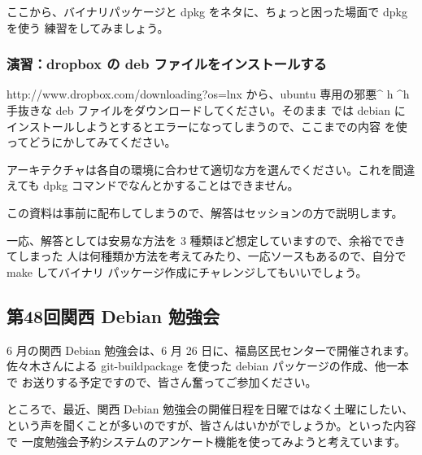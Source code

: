 \documentclass[mingoth,a4paper]{jsarticle}
\begin{document}
ここから、バイナリパッケージと dpkg をネタに、ちょっと困った場面で dpkg を使う
練習をしてみましょう。

\subsubsection{演習：dropbox の deb ファイルをインストールする}

http://www.dropbox.com/downloading?os=lnx から、ubuntu 専用の邪悪\textasciicircum
h \textasciicircum h 手抜きな deb ファイルをダウンロードしてください。そのまま
では debian にインストールしようとするとエラーになってしまうので、ここまでの内容
を使ってどうにかしてみてください。

アーキテクチャは各自の環境に合わせて適切な方を選んでください。これを間違えても
dpkg コマンドでなんとかすることはできません。

この資料は事前に配布してしまうので、解答はセッションの方で説明します。

一応、解答としては安易な方法を 3 種類ほど想定していますので、余裕でできてしまった
人は何種類か方法を考えてみたり、一応ソースもあるので、自分で make してバイナリ
パッケージ作成にチャレンジしてもいいでしょう。


\subsection{第48回関西 Debian 勉強会}
6 月の関西 Debian 勉強会は、6 月 26 日に、福島区民センターで開催されます。
佐々木さんによる git-buildpackage を使った debian パッケージの作成、他一本で
お送りする予定ですので、皆さん奮ってご参加ください。

ところで、最近、関西 Debian 勉強会の開催日程を日曜ではなく土曜にしたい、
という声を聞くことが多いのですが、皆さんはいかがでしょうか。といった内容で
一度勉強会予約システムのアンケート機能を使ってみようと考えています。

\mbox{}\newpage

\printindex
 \cleartooddpage
\end{document}
